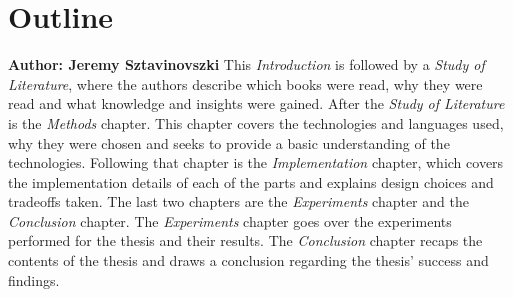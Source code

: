 \section{Outline}
\textbf{Author: Jeremy Sztavinovszki}
This \textit{Introduction} is followed by a \textit{Study of Literature}, where the authors describe which books were read, why they were read and what knowledge and insights were gained.
After the \textit{Study of Literature} is the \textit{Methods} chapter. This chapter covers the technologies and languages used, why they were chosen and seeks to provide a basic understanding of the 
technologies. Following that chapter is the
\textit{Implementation} chapter, which covers the implementation details of each of the parts and explains design choices and tradeoffs taken. The last two chapters are the
\textit{Experiments} chapter and the \textit{Conclusion} chapter. The \textit{Experiments} chapter goes over the experiments performed for the thesis and their results. The \textit{Conclusion} chapter
recaps the contents of the thesis and draws a conclusion regarding the thesis' success and findings.

\filbreak

